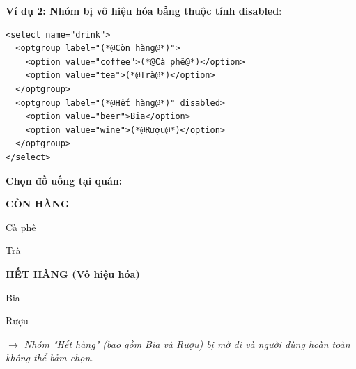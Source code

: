 \textbf{Ví dụ 2: Nhóm bị vô hiệu hóa bằng thuộc tính disabled}:
\begin{codeWindow}
\begin{lstlisting}[language=HTML5]
<select name="drink">
  <optgroup label="(*@Còn hàng@*)">
    <option value="coffee">(*@Cà phê@*)</option>
    <option value="tea">(*@Trà@*)</option>
  </optgroup>
  <optgroup label="(*@Hết hàng@*)" disabled>
    <option value="beer">Bia</option>
    <option value="wine">(*@Rượu@*)</option>
  </optgroup>
</select>
\end{lstlisting}
\end{codeWindow}

\begin{browserWindow}
\sffamily\small
\textbf{Chọn đồ uống tại quán:} \par\vspace{4pt}
\begin{tcolorbox}[arc=2pt, colback=white, colframe=primaryBlue!50, boxsep=4pt, width=0.6\linewidth]
  \small
  \textbf{\textcolor{gray!80}{CÒN HÀNG}} \par\vspace{2pt}
  \quad Cà phê \par\vspace{2pt}
  \quad Trà \par\vspace{3pt}
  \textbf{\textcolor{gray!40}{HẾT HÀNG (Vô hiệu hóa)}} \par\vspace{2pt}
  \quad \textcolor{gray!40}{Bia} \par\vspace{2pt}
  \quad \textcolor{gray!40}{Rượu}
\end{tcolorbox}
\par\vspace{4pt}
\textcolor{codeComment}{\small\textit{$\rightarrow$ Nhóm "Hết hàng" (bao gồm Bia và Rượu) bị mờ đi và người dùng hoàn toàn không thể bấm chọn.}}
\end{browserWindow}


